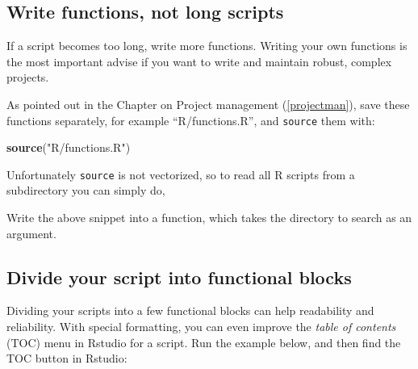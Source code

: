 \documentclass[]{book}
\newenvironment{Shaded}{\begin{snugshade}}{\end{snugshade}}
\newcommand{\ControlFlowTok}[1]{\textcolor[rgb]{0.13,0.29,0.53}{\textbf{#1}}}
\newcommand{\DataTypeTok}[1]{\textcolor[rgb]{0.13,0.29,0.53}{#1}}
\newcommand{\KeywordTok}[1]{\textcolor[rgb]{0.13,0.29,0.53}{\textbf{#1}}}
\newcommand{\NormalTok}[1]{#1}
\newcommand{\OtherTok}[1]{\textcolor[rgb]{0.56,0.35,0.01}{#1}}
\newcommand{\StringTok}[1]{\textcolor[rgb]{0.31,0.60,0.02}{#1}}
\let\BeginKnitrBlock\begin \let\EndKnitrBlock\end
\begin{document}
\hypertarget{write-functions-not-long-scripts}{%
\subsection{Write functions, not long scripts}\label{write-functions-not-long-scripts}}

If a script becomes too long, write more functions. Writing your own functions is the most important advise if you want to write and maintain robust, complex projects.

As pointed out in the Chapter on Project management (\ref{projectman}), save these functions separately, for example ``R/functions.R'', and \texttt{source} them with:

\begin{Shaded}
\begin{Highlighting}[]
\KeywordTok{source}\NormalTok{(}\StringTok{"R/functions.R"}\NormalTok{)}
\end{Highlighting}
\end{Shaded}

Unfortunately \texttt{source} is not vectorized, so to read all R scripts from a subdirectory you can simply do,

\begin{Shaded}
\end{Shaded}

\BeginKnitrBlock{rmdtry}
Write the above snippet into a function, which takes the directory to search as an argument.
\EndKnitrBlock{rmdtry}

\hypertarget{divide-your-script-into-functional-blocks}{%
\subsection{Divide your script into functional blocks}\label{divide-your-script-into-functional-blocks}}

Dividing your scripts into a few functional blocks can help readability and reliability.
With special formatting, you can even improve the \emph{table of contents} (TOC) menu in Rstudio for a script. Run the example below, and then find the TOC button in Rstudio:
\end{document}
